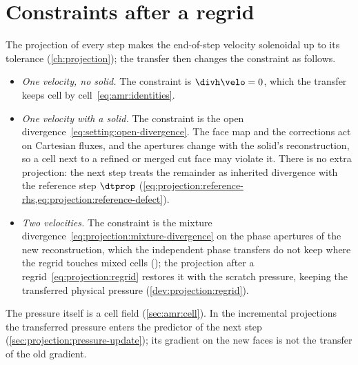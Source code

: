 \section{Constraints after a regrid}\label{sec:amr:divergence}
The projection of every step makes the end-of-step velocity solenoidal up to
its tolerance (\cref{ch:projection}); the transfer then changes the
constraint as follows.
\begin{itemize}
\item \emph{One velocity, no solid.} The constraint is $\divh\velo=0$, which
  the transfer keeps cell by cell~\cref{eq:amr:identities}.
\item \emph{One velocity with a solid.} The constraint is the open
  divergence~\cref{eq:setting:open-divergence}. The face map and the
  corrections act on Cartesian fluxes, and the apertures change with the
  solid's reconstruction, so a cell next to a refined or merged cut face may
  violate it. There is no extra projection: the next step treats the
  remainder as inherited divergence with the reference step $\dtprop$
  (\cref{eq:projection:reference-rhs,eq:projection:reference-defect}).
\item \emph{Two velocities.} The constraint is the mixture
  divergence~\cref{eq:projection:mixture-divergence} on the phase apertures
  of the new reconstruction, which the independent phase transfers do not
  keep where the regrid touches mixed cells (); the projection
  after a regrid~\cref{eq:projection:regrid} restores it with the scratch
  pressure, keeping the transferred physical pressure
  (\cref{dev:projection:regrid}).
\end{itemize}
The pressure itself is a cell field (\cref{sec:amr:cell}). In the
incremental projections the transferred pressure enters the predictor of the
next step (\cref{sec:projection:pressure-update}); its gradient on the new
faces is not the transfer of the old gradient.

